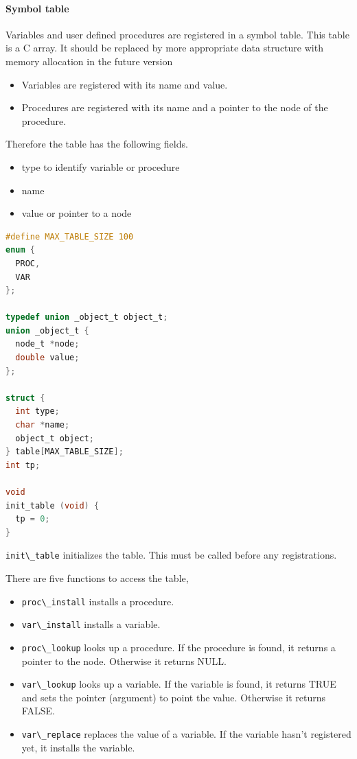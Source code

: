 \hypertarget{symbol-table}{%
\paragraph{Symbol table}\label{symbol-table}}

Variables and user defined procedures are registered in a symbol table.
This table is a C array. It should be replaced by more appropriate data
structure with memory allocation in the future version

\begin{itemize}
\tightlist
\item
  Variables are registered with its name and value.
\item
  Procedures are registered with its name and a pointer to the node of
  the procedure.
\end{itemize}

Therefore the table has the following fields.

\begin{itemize}
\tightlist
\item
  type to identify variable or procedure
\item
  name
\item
  value or pointer to a node
\end{itemize}

\begin{lstlisting}[language=C]
#define MAX_TABLE_SIZE 100
enum {
  PROC,
  VAR
};

typedef union _object_t object_t;
union _object_t {
  node_t *node;
  double value;
};

struct {
  int type;
  char *name;
  object_t object;
} table[MAX_TABLE_SIZE];
int tp;

void
init_table (void) {
  tp = 0;
}
\end{lstlisting}

\passthrough{\lstinline!init\_table!} initializes the table. This must
be called before any registrations.

There are five functions to access the table,

\begin{itemize}
\tightlist
\item
  \passthrough{\lstinline!proc\_install!} installs a procedure.
\item
  \passthrough{\lstinline!var\_install!} installs a variable.
\item
  \passthrough{\lstinline!proc\_lookup!} looks up a procedure. If the
  procedure is found, it returns a pointer to the node. Otherwise it
  returns NULL.
\item
  \passthrough{\lstinline!var\_lookup!} looks up a variable. If the
  variable is found, it returns TRUE and sets the pointer (argument) to
  point the value. Otherwise it returns FALSE.
\item
  \passthrough{\lstinline!var\_replace!} replaces the value of a
  variable. If the variable hasn't registered yet, it installs the
  variable.
\end{itemize}

